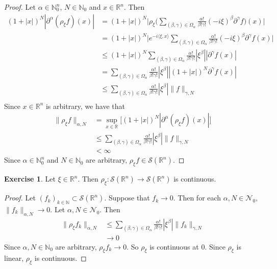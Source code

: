 \documentclass{book}
\theoremstyle{definition}
\newtheorem{ex}[definition]{Exercise}
\newcommand{\al}{\alpha}
\newcommand{\be}{\beta}
\newcommand{\gam}{\gamma}
\newcommand{\Om}{\Omega}
\newcommand{\N}{\mathbb{N}}
\newcommand{\R}{\mathbb{R}}
\newcommand{\MN}{\mathcal{N}}
\newcommand{\MS}{\mathcal{S}}
\DeclareMathOperator*{\0}{\mbf{0}}
\DeclareMathOperator*{\1}{\mbf{1}}
\renewcommand{\r}{\rangle}
\renewcommand{\l}{\langle}
\newcommand{\p}{\partial}
\begin{document}
	\begin{proof}
		Let $\al \in \N_0^n$, $N \in \N_0$ and $x \in \R^n$. Then  
		\begin{align*}
			(1+|x|)^N |\p^{\al} (\rho_{\xi}f)(x)|
			& = (1+|x|)^N \bigg |\rho_{\xi} \bigg( \sum_{(\be, \gam) \in \Om_{\al}} \frac{\al!}{\be! \gam!} (-i \xi)^{\be}  \p^{\gam} f \bigg )(x) \bigg| \\
			& = (1+|x|)^N \bigg |e^{-i \l \xi, x \r} \sum_{(\be, \gam) \in \Om_{\al}} \frac{\al!}{\be! \gam!} (-i \xi)^{\be}  \p^{\gam} f(x) \bigg| \\
			& \leq (1+|x|)^N \sum_{(\be, \gam) \in \Om_{\al}} \frac{\al!}{\be! \gam!}  |\xi^{\be}|  |\p^{\gam} f (x)| \\
			& = \sum_{(\be, \gam) \in \Om_{\al}} \frac{\al!}{\be! \gam!}  |\xi^{\be}|  |(1+|x|)^N \p^{\gam} f (x)| \\
			& \leq \sum_{(\be, \gam) \in \Om_{\al}} \frac{\al!}{\be! \gam!}  |\xi^{\be}| \|f\|_{\gam, N} \\
		\end{align*}
		Since $x \in \R^n$ is arbitrary, we have that
		\begin{align*}
			\|\rho_{\xi} f\|_{\al, N}
			& = \sup_{x \in \R} \bigg[ (1+|x|)^N |\p^{\al} (\rho_{\xi} f)(x)|\bigg] \\
			& \leq \sum_{(\be, \gam) \in \Om_{\al}} \frac{\al!}{\be! \gam!}  |\xi^{\be}| \|f\|_{\gam, N} \\
			& < \infty
		\end{align*}
		Since $\al \in \N_0^n$ and $N \in \N_0$ are arbitrary, $\rho_{\xi} f \in \MS(\R^n)$.
	\end{proof}
	
	\begin{ex}
		Let $\xi \in \R^n$. Then $\rho_{\xi}: \MS(\R^n) \rightarrow \MS(\R^n)$ is continuous.
	\end{ex}
	
	\begin{proof} 
		Let $(f_k)_{k \in \N} \subset \MS(\R^n)$. Suppose that $f_k \rightarrow 0$. Then for each $\al,N \in \MN_0$, $\|f_k\|_{\al, N} \rightarrow 0$. Let $\al,N \in \MN_0$. Then 
		\begin{align*}
			\|\rho_{\xi}f_k\|_{\al, N} 
			& \leq \sum_{(\be, \gam) \in \Om_{\al}} \frac{\al!}{\be! \gam!}  |\xi^{\be}| \|f_k\|_{\gam, N} \\
			& \rightarrow 0
		\end{align*}
		Since $\al, N \in \N_0$ are arbitrary, $\rho_{\xi} f_k \rightarrow 0$. So $\rho_{\xi}$  is continuous at $0$. Since $\rho_{\xi}$ is linear, $\rho_{\xi}$ is continuous.
	\end{proof}
\end{document}

